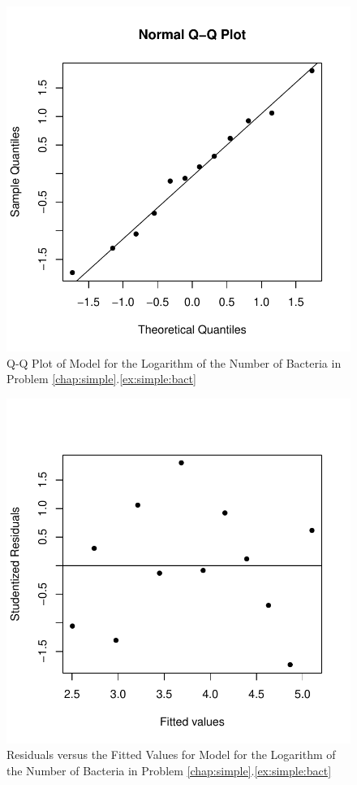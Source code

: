\begin{solution}{2.22}
\begin{enumerate}
\begin{figure}
\begin{knitrout}
{\centering \includegraphics[width=.45\linewidth]{figure/fig-simple-bact6-1}

}



\end{knitrout}
\caption{Q-Q Plot of Model for the Logarithm of the Number of Bacteria in Problem \ref{chap:simple}.\ref{ex:simple:bact}} \label{fig:simple:bact6}
\end{figure}

\begin{figure}
\begin{knitrout}
\color{fgcolor}

{\centering \includegraphics[width=.45\linewidth]{figure/fig-simple-bact7-1}

}



\end{knitrout}
\caption{Residuals versus the Fitted Values for Model for the Logarithm of the Number of Bacteria in Problem \ref{chap:simple}.\ref{ex:simple:bact}}
\label{fig:simple:bact7}
\end{figure}

\end{enumerate}
\end{solution}
